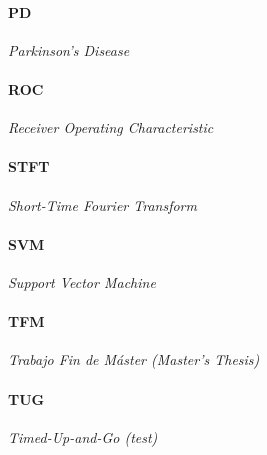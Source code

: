 \paragraph{PD} \textit{Parkinson's Disease}
\paragraph{ROC} \textit{Receiver Operating Characteristic}
\paragraph{STFT} \textit{Short-Time Fourier Transform}
\paragraph{SVM} \textit{Support Vector Machine}
\paragraph{TFM} \textit{Trabajo Fin de Máster (Master's Thesis)}
\paragraph{TUG} \textit{Timed-Up-and-Go (test)}
